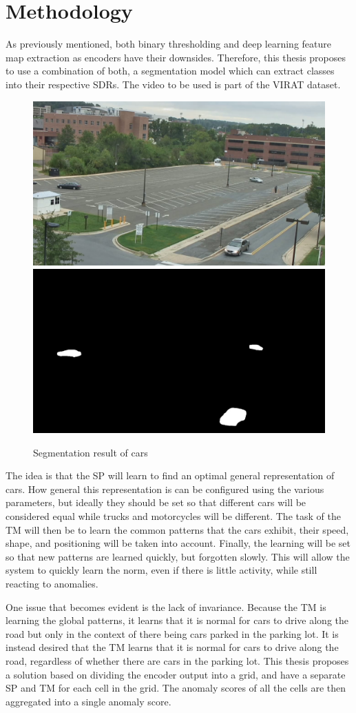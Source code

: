 \chapter{Methodology}
As previously mentioned, both binary thresholding and deep learning feature map extraction as encoders have their downsides. Therefore, this thesis proposes to use a combination of both, a segmentation model which can extract classes into their respective SDRs. The video to be used is part of the VIRAT dataset.
\begin{figure}[H]
    \centering
    \includegraphics[width=.45\textwidth]{resources/methodology/original.png}\hfill
    \includegraphics[width=.45\textwidth]{resources/methodology/car_segmentation.png}
    \caption{Segmentation result of cars}
    \label{fig:figure3}
\end{figure}
The idea is that the SP will learn to find an optimal general representation of cars. How general this representation is can be configured using the various parameters, but ideally they should be set so that different cars will be considered equal while trucks and motorcycles will be different. The task of the TM will then be to learn the common patterns that the cars exhibit, their speed, shape, and positioning will be taken into account. Finally, the learning will be set so that new patterns are learned quickly, but forgotten slowly. This will allow the system to quickly learn the norm, even if there is little activity, while still reacting to anomalies.\par
One issue that becomes evident is the lack of invariance. Because the TM is learning the global patterns, it learns that it is normal for cars to drive along the road but only in the context of there being cars parked in the parking lot. It is instead desired that the TM learns that it is normal for cars to drive along the road, regardless of whether there are cars in the parking lot. This thesis proposes a solution based on dividing the encoder output into a grid, and have a separate SP and TM for each cell in the grid. The anomaly scores of all the cells are then aggregated into a single anomaly score.
